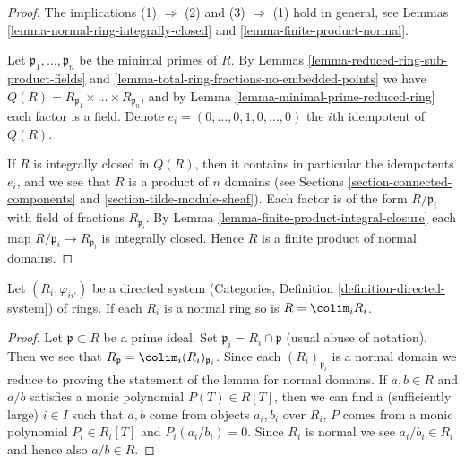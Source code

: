 \begin{proof}
The implications (1) $\Rightarrow$ (2) and
(3) $\Rightarrow$ (1) hold in general,
see Lemmas \ref{lemma-normal-ring-integrally-closed} and
\ref{lemma-finite-product-normal}.

\medskip\noindent
Let $\mathfrak p_1, \ldots, \mathfrak p_n$ be the minimal primes of $R$.
By Lemmas \ref{lemma-reduced-ring-sub-product-fields} and
\ref{lemma-total-ring-fractions-no-embedded-points} we have
$Q(R) = R_{\mathfrak p_1} \times \ldots \times R_{\mathfrak p_n}$, and
by Lemma \ref{lemma-minimal-prime-reduced-ring} each factor is a field.
Denote $e_i = (0, \ldots, 0, 1, 0, \ldots, 0)$ the $i$th idempotent
of $Q(R)$.

\medskip\noindent
If $R$ is integrally closed in $Q(R)$, then it contains in particular
the idempotents $e_i$, and we see that $R$ is a product of $n$
domains (see Sections \ref{section-connected-components} and
\ref{section-tilde-module-sheaf}). Each factor is of the form
$R/\mathfrak p_i$ with field of fractions $R_{\mathfrak p_i}$. 
By Lemma \ref{lemma-finite-product-integral-closure} each map
$R/\mathfrak p_i \to R_{\mathfrak p_i}$ is integrally closed. 
Hence $R$ is a finite product of normal domains.
\end{proof}

\begin{lemma}
\label{lemma-colimit-normal-ring}
Let $(R_i, \varphi_{ii'})$ be a directed system
(Categories, Definition \ref{definition-directed-system})
of rings. If each $R_i$ is a normal ring so is
$R = \colim_i R_i$.
\end{lemma}

\begin{proof}
Let $\mathfrak p \subset R$ be a prime ideal.
Set $\mathfrak p_i = R_i \cap \mathfrak p$ (usual abuse of notation).
Then we see that
$R_{\mathfrak p} = \colim_i (R_i)_{\mathfrak p_i}$.
Since each $(R_i)_{\mathfrak p_i}$ is a normal domain we
reduce to proving the statement of the lemma for normal
domains. If $a, b \in R$ and $a/b$ satisfies a monic polynomial
$P(T) \in R[T]$, then we can find a (sufficiently large) $i \in I$
such that $a, b$ come from objects $a_i, b_i$ over $R_i$, $P$ comes from a
monic polynomial $P_i\in R_i[T]$ and $P_i(a_i/b_i)=0$. Since $R_i$ is normal we
see $a_i/b_i \in R_i$ and hence also $a/b \in R$.
\end{proof}







